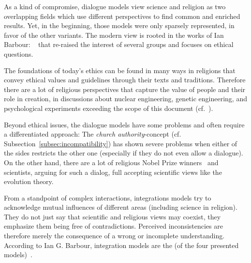 
As a kind of compromise, dialogue models view science and religion as two overlapping fields which use different perspectives to find common and enriched results.
Yet, in the beginning, those models were only sparsely represented, in favor of the other variants.
The modern view is rooted in the works of Ian Barbour: ~\cite{barbour1976myths} that re-raised the interest of several groups and focuses on ethical questions.

The foundations of today's ethics can be found in many ways in religions that convey ethical values and guidelines through their texts and traditions.
Therefore there are a lot of religious perspectives that capture the value of people and their role in creation, in discussions about nuclear engineering, genetic engineering, and psychological experiments exceeding the scope of this document (cf.~\cite{barbour1993ethics,reiss2001improving}).

Beyond ethical issues, the dialogue models have some problems and often require a differentiated approach:
The \emph{church authority}-concept (cf. Subsection~\ref{subsec:incompatibility}) has shown severe problems when either of the sides restricts the other one (especially if they do not even allow a dialogue).
On the other hand, there are a lot of religious Nobel Prize winners~\cite{shalev2002100} and scientists, arguing for such a dialog, full accepting scientific views like the evolution theory.



From a standpoint of complex interactions, integrations models try to acknowledge mutual influences of different areas (including science in religion).
They do not just say that scientific and religious views may coexist, they emphasize them being free of contradictions.
Perceived inconsistencies are therefore merely the consequence of a wrong or incomplete understanding.
According to Ian G. Barbour, integration models are the  (of the four presented models)~\cite[p.~2]{Barbour2002}.




